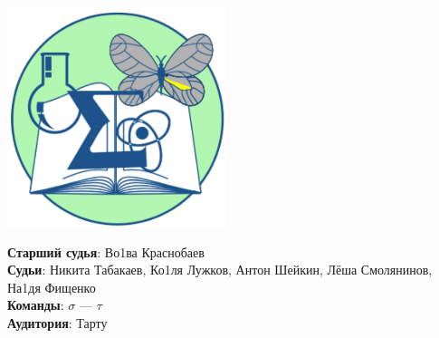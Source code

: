 \documentclass[12pt]{article}
\begin{document}
\begin{minipage}{.30\textwidth}
\begin{center}
\includegraphics[width=0.48\textwidth]{klshlogo.pdf}
\end{center}
\end{minipage}
\begin{minipage}{.65\textwidth}
\begin{flushleft}
{\bf Старший судья}: Во1ва Краснобаев\\ 
{\bf Судьи}: Никита Табакаев, Ко1ля Лужков, Антон Шейкин, Лёша Смолянинов, На1дя Фищенко\\ 
{\bf Команды}: $\sigma$ --- $\tau$\\ 
{\bf Аудитория}: Тарту\\ 
\end{flushleft}
\end{minipage}
\end{document}

